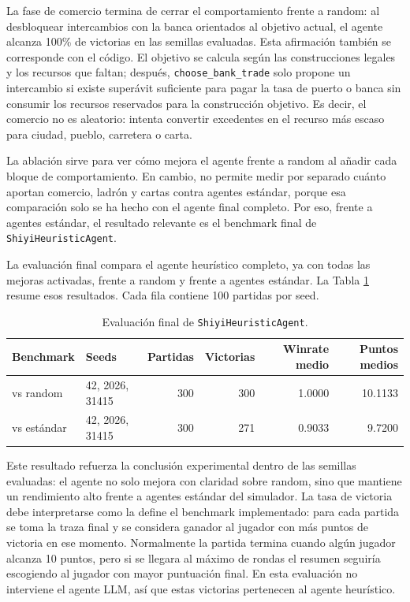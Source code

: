 ﻿\documentclass[10pt,a4paper]{article}
\begin{document}
La fase de comercio termina de cerrar el comportamiento frente a random: al desbloquear intercambios con la banca orientados al objetivo actual, el agente alcanza 100\% de victorias en las semillas evaluadas. Esta afirmación también se corresponde con el código. El objetivo se calcula según las construcciones legales y los recursos que faltan; después, \texttt{choose\_bank\_trade} solo propone un intercambio si existe superávit suficiente para pagar la tasa de puerto o banca sin consumir los recursos reservados para la construcción objetivo. Es decir, el comercio no es aleatorio: intenta convertir excedentes en el recurso más escaso para ciudad, pueblo, carretera o carta.

La ablación sirve para ver cómo mejora el agente frente a random al añadir cada bloque de comportamiento. En cambio, no permite medir por separado cuánto aportan comercio, ladrón y cartas contra agentes estándar, porque esa comparación solo se ha hecho con el agente final completo. Por eso, frente a agentes estándar, el resultado relevante es el benchmark final de \texttt{ShiyiHeuristicAgent}.

La evaluación final compara el agente heurístico completo, ya con todas las mejoras activadas, frente a random y frente a agentes estándar. La Tabla \ref{tab:heurfinal} resume esos resultados. Cada fila contiene 100 partidas por seed.

\begin{table}[H]
\centering
\small
\begin{tabular}{llrrrr}
\toprule
Benchmark & Seeds & Partidas & Victorias & Winrate medio & Puntos medios \\
\midrule
vs random & 42, 2026, 31415 & 300 & 300 & 1.0000 & 10.1133 \\
vs estándar & 42, 2026, 31415 & 300 & 271 & 0.9033 & 9.7200 \\
\bottomrule
\end{tabular}
\caption{Evaluación final de \texttt{ShiyiHeuristicAgent}.}
\label{tab:heurfinal}
\end{table}

Este resultado refuerza la conclusión experimental dentro de las semillas evaluadas: el agente no solo mejora con claridad sobre random, sino que mantiene un rendimiento alto frente a agentes estándar del simulador. La tasa de victoria debe interpretarse como la define el benchmark implementado: para cada partida se toma la traza final y se considera ganador al jugador con más puntos de victoria en ese momento. Normalmente la partida termina cuando algún jugador alcanza 10 puntos, pero si se llegara al máximo de rondas el resumen seguiría escogiendo al jugador con mayor puntuación final. En esta evaluación no interviene el agente LLM, así que estas victorias pertenecen al agente heurístico.
\end{document}
